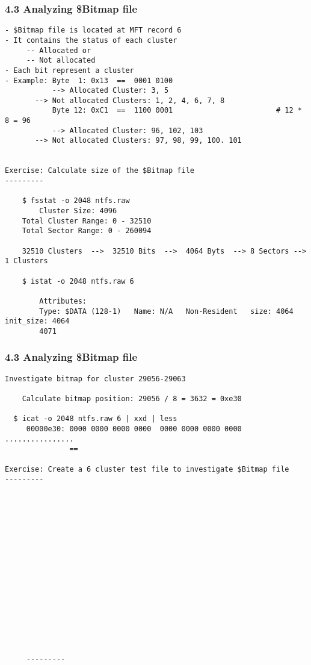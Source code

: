 \begin{frame}[fragile]
  \frametitle{4.3 Analyzing \$Bitmap file}
  \begin{lstlisting}[basicstyle=\tiny]
- $Bitmap file is located at MFT record 6
- It contains the status of each cluster
     -- Allocated or
     -- Not allocated
- Each bit represent a cluster
- Example: Byte  1: 0x13  ==  0001 0100 
           --> Allocated Cluster: 3, 5
	   --> Not allocated Clusters: 1, 2, 4, 6, 7, 8
           Byte 12: 0xC1  ==  1100 0001                        # 12 * 8 = 96
           --> Allocated Cluster: 96, 102, 103
	   --> Not allocated Clusters: 97, 98, 99, 100. 101


Exercise: Calculate size of the $Bitmap file
---------

    $ fsstat -o 2048 ntfs.raw
        Cluster Size: 4096
	Total Cluster Range: 0 - 32510
	Total Sector Range: 0 - 260094

    32510 Clusters  -->  32510 Bits  -->  4064 Byts  --> 8 Sectors --> 1 Clusters

    $ istat -o 2048 ntfs.raw 6

        Attributes:
        Type: $DATA (128-1)   Name: N/A   Non-Resident   size: 4064  init_size: 4064
        4071
  \end{lstlisting}
\end{frame}


\begin{frame}[fragile]
  \frametitle{4.3 Analyzing \$Bitmap file}
  \begin{lstlisting}[basicstyle=\tiny]
Investigate bitmap for cluster 29056-29063

    Calculate bitmap position: 29056 / 8 = 3632 = 0xe30
  
  $ icat -o 2048 ntfs.raw 6 | xxd | less
     00000e30: 0000 0000 0000 0000  0000 0000 0000 0000  ................
               ==

Exercise: Create a 6 cluster test file to investigate $Bitmap file
---------

















     ---------
  \end{lstlisting}
\end{frame}


